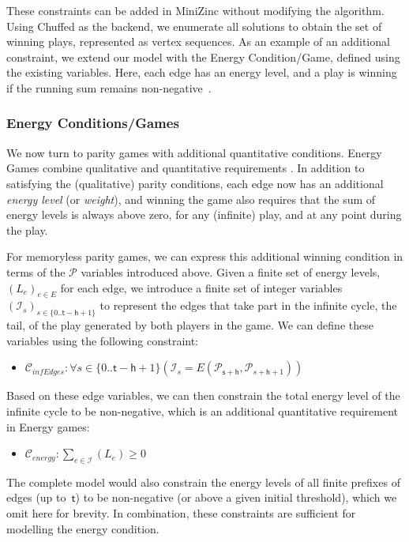 \documentclass{article}
\begin{document}
These constraints can be added in MiniZinc without modifying the \noc algorithm. Using Chuffed as the backend, we enumerate all solutions to obtain the set of winning plays, represented as vertex sequences. As an example of an additional constraint, we extend our model with the Energy Condition/Game, defined using the existing variables. Here, each edge has an energy level, and a play is winning if the running sum remains non-negative~\cite{Chatterjee:2010}.

\subsubsection{Energy Conditions/Games}

We now turn to parity games with additional quantitative conditions. Energy Games combine qualitative and quantitative requirements \cite{Chatterjee:2010}. In addition to satisfying the (qualitative) parity conditions, each edge now has an additional \textit{energy level} (or \textit{weight}), and winning the game also requires that the sum of energy levels is always above zero, for any (infinite) play, and at any point during the play.

For memoryless parity games, we can express this additional winning condition in terms of the $\mathcal{P}$ variables introduced above. 
%
Given a finite set of energy levels, $(L_e)_{e \in E}$ for each edge, we introduce a finite set of integer variables $(\mathcal{I}_s)_{s \in \{0..\mathsf{t} -\mathsf{h}+1\}}$ to represent the edges that take part in the infinite cycle, the tail, of the play generated by both players in the game. We can define these variables using the following constraint:
\begin{itemize}
    \item $\mathcal{C}_{\textit{infEdges}} : \forall s \in \{0..\mathsf{t} -\mathsf{h}+1\} (\mathcal{I}_s = E(\mathcal{P}_{\mathsf{s}+\mathsf{h}},\mathcal{P}_{s+\mathsf{h}+1}) )$
\end{itemize}

Based on these edge variables, we can then constrain the total energy level of the infinite cycle to be non-negative, which is an additional quantitative requirement in Energy games:

\begin{itemize}
    \item $\mathcal{C}_{\textit{energy}} : \sum_{e \in \mathcal{I}} (L_e) \geq 0$
\end{itemize}

The complete model would also constrain the energy levels of all finite prefixes of edges (up to~$\mathsf{t}$) to be non-negative (or above a given initial threshold), which we omit here for brevity. In combination, these constraints are sufficient for modelling the energy condition.
\end{document}
